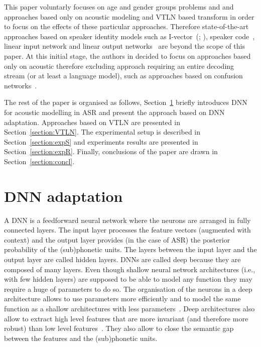 \documentclass{nle}
\begin{document}
This paper voluntarly focuses on age and gender groups problems and and approaches based only on acoustic modeling and VTLN based transform in order to focus on the effects of these particular approaches. Therefore state-of-the-art approaches based on speaker identity models such as I-vector~(\citealp*{dehak2011front,saon2013speaker}; \citealp{42536}), speaker code~\citep*{abdel2013fast}, linear input network and linear output networks~\citep*{li2010comparison} are beyond the scope of this paper. At this initial stage, the authors in decided to focus on approaches based only on acoustic therefore excluding approach requiring an entire decoding stream (or at least a language model), such as approaches based on confusion networks~\citep*{mangu2000finding}.

The    rest    of    the    paper    is    organised    as    follows,
Section~\ref{section:DNN}   briefly   introduces   DNN  for   acoustic
modelling   in   ASR  and   present   the   approach   based  on   DNN
adaptation.    Approaches   based   on    VTLN   are    presented   in
Section~\ref{section:VTLN}.  The experimental  setup  is described  in
Section~\ref{section:expS}  and experiments  results are  presented in
Section~\ref{section:expR}.  Finally,  conclusions  of the  paper  are
drawn in Section~\ref{section:concl}.

\section{DNN adaptation}\label{section:DNN}
A DNN is a feedforward neural network where the neurons are arranged in fully connected layers. The input layer processes the feature vectors (augmented with context) and the output layer provides (in the case of ASR) the posterior probability of the (sub)phonetic units. The layers between the input layer and the output layer are called hidden layers. DNNs are called deep because they are composed of many layers. Even though shallow neural network architectures (i.e., with few hidden layers) are supposed to be able to model any function they may require a huge of parameters to do so. The organisation of the neurons in a deep architecture allows to use parameters more efficiently and to model the same function as a shallow architectures with less parameters~\citep*{bengio2013representation}. Deep architectures also allow to extract high level features that are more invariant (and therefore more robust) than low level features~\citep{hinton12}. They also allow to close the 
semantic gap between the features and the (sub)phonetic units. 
\end{document}
